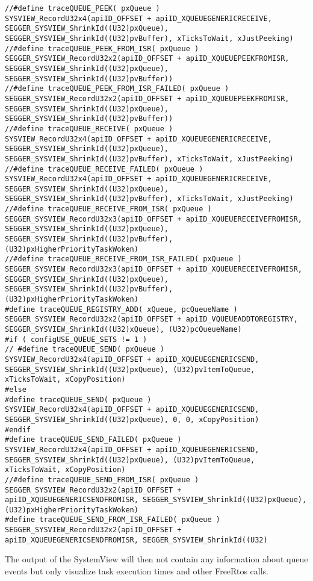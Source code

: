 \begin{lstlisting}
//#define traceQUEUE_PEEK( pxQueue )                                    SYSVIEW_RecordU32x4(apiID_OFFSET + apiID_XQUEUEGENERICRECEIVE, SEGGER_SYSVIEW_ShrinkId((U32)pxQueue), SEGGER_SYSVIEW_ShrinkId((U32)pvBuffer), xTicksToWait, xJustPeeking)
//#define traceQUEUE_PEEK_FROM_ISR( pxQueue )                           SEGGER_SYSVIEW_RecordU32x2(apiID_OFFSET + apiID_XQUEUEPEEKFROMISR, SEGGER_SYSVIEW_ShrinkId((U32)pxQueue), SEGGER_SYSVIEW_ShrinkId((U32)pvBuffer))
//#define traceQUEUE_PEEK_FROM_ISR_FAILED( pxQueue )                    SEGGER_SYSVIEW_RecordU32x2(apiID_OFFSET + apiID_XQUEUEPEEKFROMISR, SEGGER_SYSVIEW_ShrinkId((U32)pxQueue), SEGGER_SYSVIEW_ShrinkId((U32)pvBuffer))
//#define traceQUEUE_RECEIVE( pxQueue )                                 SYSVIEW_RecordU32x4(apiID_OFFSET + apiID_XQUEUEGENERICRECEIVE, SEGGER_SYSVIEW_ShrinkId((U32)pxQueue), SEGGER_SYSVIEW_ShrinkId((U32)pvBuffer), xTicksToWait, xJustPeeking)
//#define traceQUEUE_RECEIVE_FAILED( pxQueue )                          SYSVIEW_RecordU32x4(apiID_OFFSET + apiID_XQUEUEGENERICRECEIVE, SEGGER_SYSVIEW_ShrinkId((U32)pxQueue), SEGGER_SYSVIEW_ShrinkId((U32)pvBuffer), xTicksToWait, xJustPeeking)
//#define traceQUEUE_RECEIVE_FROM_ISR( pxQueue )                        SEGGER_SYSVIEW_RecordU32x3(apiID_OFFSET + apiID_XQUEUERECEIVEFROMISR, SEGGER_SYSVIEW_ShrinkId((U32)pxQueue), SEGGER_SYSVIEW_ShrinkId((U32)pvBuffer), (U32)pxHigherPriorityTaskWoken)
//#define traceQUEUE_RECEIVE_FROM_ISR_FAILED( pxQueue )                 SEGGER_SYSVIEW_RecordU32x3(apiID_OFFSET + apiID_XQUEUERECEIVEFROMISR, SEGGER_SYSVIEW_ShrinkId((U32)pxQueue), SEGGER_SYSVIEW_ShrinkId((U32)pvBuffer), (U32)pxHigherPriorityTaskWoken)
#define traceQUEUE_REGISTRY_ADD( xQueue, pcQueueName )                SEGGER_SYSVIEW_RecordU32x2(apiID_OFFSET + apiID_VQUEUEADDTOREGISTRY, SEGGER_SYSVIEW_ShrinkId((U32)xQueue), (U32)pcQueueName)
#if ( configUSE_QUEUE_SETS != 1 )
// #define traceQUEUE_SEND( pxQueue )                                    SYSVIEW_RecordU32x4(apiID_OFFSET + apiID_XQUEUEGENERICSEND, SEGGER_SYSVIEW_ShrinkId((U32)pxQueue), (U32)pvItemToQueue, xTicksToWait, xCopyPosition)
#else
#define traceQUEUE_SEND( pxQueue )                                    SYSVIEW_RecordU32x4(apiID_OFFSET + apiID_XQUEUEGENERICSEND, SEGGER_SYSVIEW_ShrinkId((U32)pxQueue), 0, 0, xCopyPosition)
#endif
#define traceQUEUE_SEND_FAILED( pxQueue )                             SYSVIEW_RecordU32x4(apiID_OFFSET + apiID_XQUEUEGENERICSEND, SEGGER_SYSVIEW_ShrinkId((U32)pxQueue), (U32)pvItemToQueue, xTicksToWait, xCopyPosition)
//#define traceQUEUE_SEND_FROM_ISR( pxQueue )                           SEGGER_SYSVIEW_RecordU32x2(apiID_OFFSET + apiID_XQUEUEGENERICSENDFROMISR, SEGGER_SYSVIEW_ShrinkId((U32)pxQueue), (U32)pxHigherPriorityTaskWoken)
#define traceQUEUE_SEND_FROM_ISR_FAILED( pxQueue )                    SEGGER_SYSVIEW_RecordU32x2(apiID_OFFSET + apiID_XQUEUEGENERICSENDFROMISR, SEGGER_SYSVIEW_ShrinkId((U32)
\end{lstlisting}
The output of the SystemView will then not contain any information about queue events but only visualize task execution times and other FreeRtos calls.
%
%
